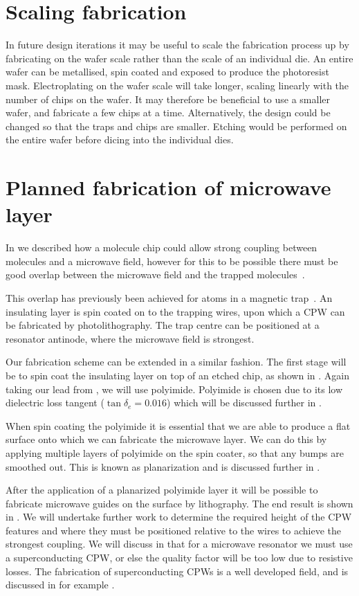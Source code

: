 \section{Scaling fabrication}

In future design iterations it may be useful to scale the fabrication process
up by fabricating on the wafer scale rather than the scale of an individual
die. An entire wafer can be metallised, spin coated and exposed to
produce the photoresist mask. Electroplating on the wafer scale will take
longer, scaling linearly with the number of chips on the wafer. It may therefore
be beneficial to use a smaller wafer, and fabricate a few chips at a time.
Alternatively, the design could be changed so that the traps and chips are
smaller. Etching would be performed on the entire wafer before dicing into the
individual dies.

\section{Planned fabrication of microwave layer}
\label{fab:planned}

In 
we described how a molecule chip could allow strong coupling between \CaF{}
molecules and a microwave field, however for this to be possible there must be
good overlap between the microwave field and the trapped
molecules~\cite{Andre2006}.

This overlap has previously been achieved for atoms in a magnetic
trap~\cite{Treutlein2008}. An insulating layer is spin coated on to the
trapping wires, upon which a CPW can be fabricated by photolithography. The
trap centre can be positioned at a resonator antinode, where the microwave
field is strongest.

Our fabrication scheme can be extended in a similar fashion. The first stage will be to spin coat the insulating layer on top of an
etched chip, as shown in . Again taking our
lead from , we will use polyimide. Polyimide is chosen
due to its low dielectric loss tangent ($\tan\delta_e = 0.016$) which will
be discussed further in .

When spin coating the polyimide it is essential that we are able to produce a
flat surface onto which we can fabricate the microwave layer. We can do this by
applying multiple layers of polyimide on the spin coater, so that any bumps are
smoothed out. This is known as planarization and is discussed further in
.

After the application of a planarized polyimide layer it will be possible to
fabricate microwave guides on the surface by lithography. The end result is
shown in . We will undertake further work to
determine the required height of the CPW features and where they must be
positioned relative to the wires to achieve the strongest coupling. We will
discuss in  that for a microwave resonator we must use
a superconducting CPW, or else the quality factor will be too low due to
resistive losses. The fabrication of superconducting CPWs is a well developed
field, and is discussed in for example .

